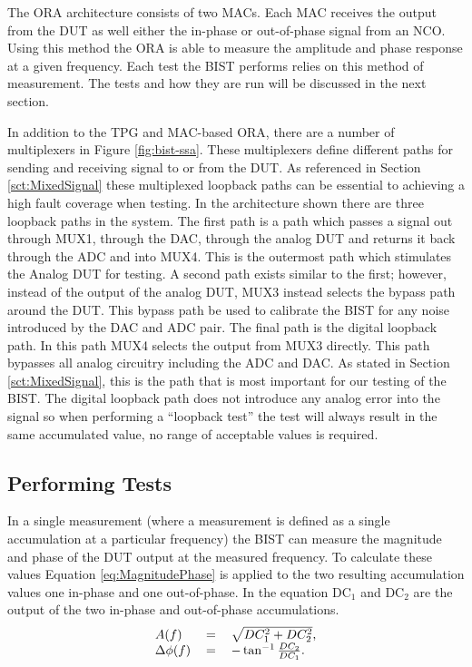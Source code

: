 \documentclass[12pt]{report}
\begin{document}
The ORA architecture consists of two MACs.  Each MAC receives the output from the DUT as well either the in-phase or out-of-phase signal from an NCO.  Using this method the ORA is able to measure the amplitude and phase response at a given frequency\cite{testtime}.  Each test the BIST performs relies on this method of measurement.  The tests and how they are run will be discussed in the next section.

In addition to the TPG and MAC-based ORA, there are a number of multiplexers in Figure \ref{fig:bist-ssa}.  These multiplexers define different paths for sending and receiving signal to or from the DUT.  As referenced in Section \ref{sct:MixedSignal} these multiplexed loopback paths can be essential to achieving a high fault coverage when testing.  In the architecture shown there are three loopback paths in the system.  The first path is a path which passes a signal out through MUX1, through the DAC, through the analog DUT and returns it back through the ADC and into MUX4.  This is the outermost path which stimulates the Analog DUT for testing.  A second path exists similar to the first; however, instead of the output of the analog DUT, MUX3 instead selects the bypass path around the DUT.  This bypass path be used to calibrate the BIST for any noise introduced by the DAC and ADC pair.  The final path is the digital loopback path.  In this path MUX4 selects the output from MUX3 directly.  This path bypasses all analog circuitry including the ADC and DAC.  As stated in Section \ref{sct:MixedSignal}, this is the path that is most important for our testing of the BIST.  The digital loopback path does not introduce any analog error into the signal so when performing a ``loopback test'' the test will always result in the same accumulated value, no range of acceptable values is required\cite{stroud-analog}.

\subsection{Performing Tests}
In a single measurement (where a measurement is defined as a single accumulation at a particular frequency) the BIST can measure the magnitude and phase of the DUT output at the measured frequency.  To calculate these values Equation \ref{eq:MagnitudePhase} is applied to the two resulting accumulation values one in-phase and one out-of-phase\cite{jie}.  In the equation DC$_1$ and DC$_2$ are the output of the two in-phase and out-of-phase accumulations.
\begin{equation}
  \begin{tabular}{lll}
	$A(f)$ & $=$ & $\sqrt{DC_1^2+DC_2^2}, \nonumber$ \\
	  $\Delta\phi(f)$ & $=$ & $-\tan^{-1}\frac{DC_2}{DC_1}.$
  \end{tabular}
  \label{eq:MagnitudePhase}
\end{equation}
\end{document}
